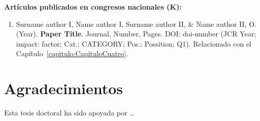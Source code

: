 \textbf{Artículos publicados en congresos nacionales (K):}

\begin{enumerate}
    \item Surname author I, Name author I, Surname author II, \& Name author II, O. (Year). \textbf{Paper Title}. Journal, Number, Pages. DOI: doi-number (JCR Year; impact: factor; Cat.: CATEGORY; Pos.: Possition; Q1). Relacionado con el Capítulo~\ref{capitulo:CapituloCuatro}.
\end{enumerate}

\section{Agradecimientos}\label{seccion:Agradecimientos}

Esta tesis doctoral ha sido apoyada por \dots